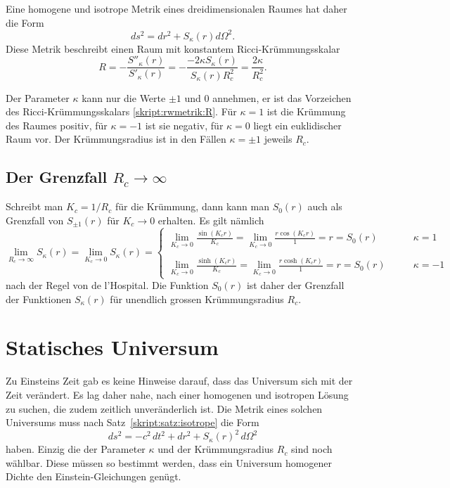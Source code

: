 \begin{satz}
\label{skript:satz:isotrope}
Eine homogene und isotrope Metrik eines dreidimensionalen Raumes
hat daher die Form
\begin{equation}
ds^2=dr^2 + S_{\kappa}(r)d\Omega^2.
\label{skript:rwmetrik:metrikS}
\end{equation}
Diese Metrik beschreibt einen Raum mit konstantem
Ricci-Krümmungs\-skalar 
\begin{equation}
R
=
-\frac{S''_\kappa(r)}{S'_\kappa(r)}
=
-\frac{-2\kappa S_\kappa(r)}{S_\kappa(r)R_c^2}
=
\frac{2\kappa}{R_c^2}.
\label{skript:rwmetrik:R}
\end{equation}
\end{satz}
Der Parameter $\kappa$ kann nur die Werte $\pm 1$ und $0$ annehmen, er ist
das Vorzeichen des Ricci-Krümmungs\-skalars \eqref{skript:rwmetrik:R}.
Für $\kappa=1$ ist die Krümmung des Raumes positiv, für $\kappa=-1$ ist
sie negativ, für $\kappa=0$ liegt ein euklidischer Raum vor.
Der Krümmungsradius ist in den Fällen $\kappa=\pm1$ jeweils $R_c$.

\subsection{Der Grenzfall $R_c\to\infty$}
Schreibt man $K_c = 1/R_c$ für die Krümmung, dann kann man $S_0(r)$
auch als Grenzfall von $S_{\pm 1}(r)$ für $K_c\to 0$ erhalten.
Es gilt  nämlich
\begin{equation}
\lim_{R_c\to\infty} S_\kappa(r)
=
\lim_{K_c\to 0} S_\kappa(r)
=\begin{cases}
\displaystyle
\lim_{K_c\to 0}\frac{\displaystyle \sin(K_cr)}{\displaystyle K_c}
=
\lim_{K_c\to 0}\frac{\displaystyle r\cos(K_cr)}{\displaystyle 1} = r = S_0(r)
&\qquad\kappa=1
\\
\\
\displaystyle
\lim_{K_c\to 0}\frac{\displaystyle \sinh(K_cr)}{\displaystyle K_c}
=
\lim_{K_c\to 0}\frac{\displaystyle r\cosh(K_cr)}{\displaystyle 1} = r = S_0(r)
&\qquad\kappa=-1
\end{cases}
\end{equation}
nach der Regel von de l'Hospital.
Die Funktion $S_0(r)$ ist daher der Grenzfall der Funktionen
$S_\kappa(r)$ für unendlich grossen Krümmungsradius $R_c$.

\section{Statisches Universum}
%
Zu Einsteins Zeit gab es keine Hinweise darauf, dass das Universum
sich mit der Zeit verändert.
Es lag daher nahe, nach einer homogenen und isotropen Lösung zu suchen,
die zudem zeitlich unveränderlich ist.
Die Metrik eines solchen Universums muss nach
Satz~\ref{skript:satz:isotrope}
die Form
\[
ds^2
=
-c^2\,dt^2 + dr^2 + S_\kappa(r)^2\,d\Omega^2
\]
haben.
Einzig die der Parameter $\kappa$ und der Krümmungsradius $R_c$ sind
noch wählbar. 
Diese müssen so bestimmt werden, dass ein Universum homogener Dichte
den Einstein-Gleichungen genügt.

